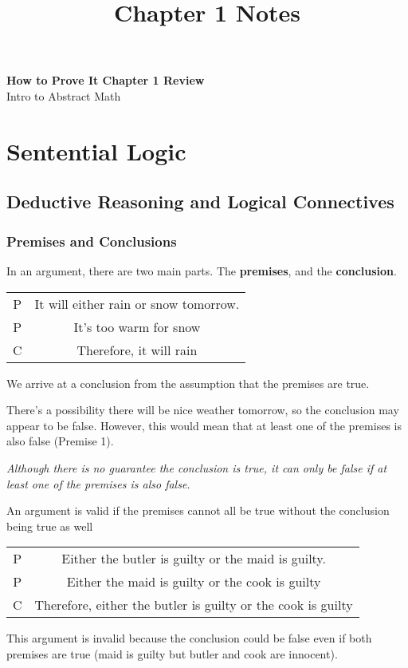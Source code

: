 \documentclass[11pt]{article}
\theoremstyle{definition}
\theoremstyle{remark}
\begin{document}
\setcounter{section}{0}
\title{Chapter 1 Notes}

\thispagestyle{empty}

\begin{center}
{\LARGE \bf How to Prove It Chapter 1 Review}\\
{\large Intro to Abstract Math}\\
\end{center}
\tableofcontents
\section{Sentential Logic}
\subsection{Deductive Reasoning and Logical Connectives}
\subsubsection{Premises and Conclusions}
In an argument, there are two main parts. The \textbf{premises}, and the \textbf{conclusion}.
\begin{center}
\begin{tabular}{ c | c }
    P & It will either rain or snow tomorrow.\\
    P & It's too warm for snow\\
    C & Therefore, it will rain
\end{tabular}
\end{center}
We arrive at a conclusion from the assumption that the premises are true.


There's a possibility there will be nice weather tomorrow, so the conclusion may appear to be false. However, this would mean that at least one of the premises is also false (Premise 1).


\textit{Although there is no guarantee the conclusion is true, it can only be false if at least one of the premises is also false.}
\begin{shaded}
An argument is valid if the premises cannot all be true without the conclusion being true as well
\end{shaded}
\begin{center}
\begin{tabular}{ c | c }
    P & Either the butler is guilty or the maid is guilty.\\
    P & Either the maid is guilty or the cook is guilty\\
    C & Therefore, either the butler is guilty or the cook is guilty
\end{tabular}
\end{center}
This argument is invalid because the conclusion could be false even if both premises are true (maid is guilty but butler and cook are innocent).
\end{document}

